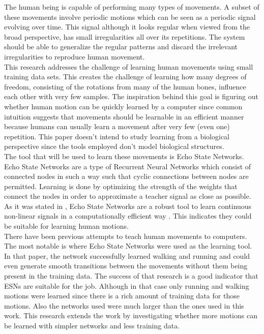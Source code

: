 \documentclass[letterpaper,9pt]{article}
\begin{document}
The human being is capable of performing many types of movements. A subset of these movements involve periodic motions which can be seen as a periodic signal evolving over time. This signal although it looks regular when viewed from the broad perspective, has small irregularities all over its repetitions. The system should be able to generalize the regular patterns and discard the irrelevant irregularities to reproduce human movement.\\

This research addresses the challenge of learning human movements using small training data sets. This creates the challenge of learning how many degrees of freedom, consisting of the rotations from many of the human bones, influence each other with very few samples. The inspiration behind this goal is figuring out whether human motion can be quickly learned by a computer since common intuition suggests that movements should be learnable in an efficient manner because humans can usually learn a movement after very few (even one) repetition. This paper doesn't intend to study learning from a biological perspective since the tools employed don't model biological structures.\\

The tool that will be used to learn these movements is Echo State Networks. Echo State Networks are a type of Recurrent Neural Networks which consist of connected nodes in such a way such that cyclic connections between nodes are permitted. Learning is done by optimizing the strength of the weights that connect the nodes in order to approximate a teacher signal as close as possible. As it was stated in \cite{JaegerESNTutorial}, Echo State Networks are a robust tool to learn continuous non-linear signals in a computationally efficient way \cite{Jaeger05TrainingRRN}. This indicates they could be suitable for learning human motions. \\

There have been previous attempts to teach human movements to computers. The most notable is \cite{GentHumanMotion} where Echo State Networks were used as the learning tool. In that paper, the network successfully learned walking and running and could even generate smooth transitions between the movements without them being present in the training data. The success of that research is a good indicator that ESNs are suitable for the job. Although in that case only running and walking motions were learned since there is a rich amount of training data for those motions. Also the networks used were much larger than the ones used in this work. This research extends the work by investigating whether more motions can be learned with simpler networks and less training data. \\
\end{document}
